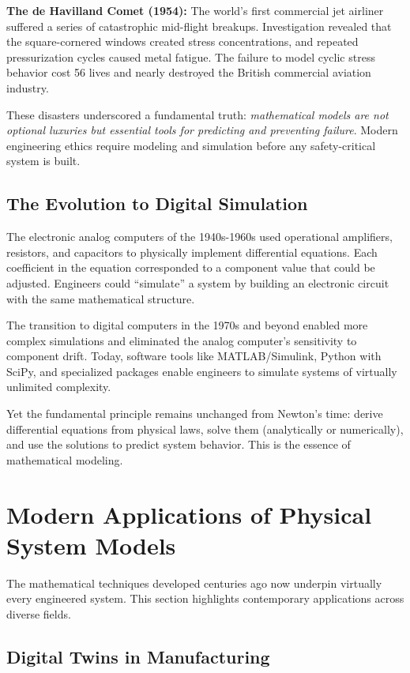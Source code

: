 \textbf{The de Havilland Comet (1954):} The world's first commercial jet airliner suffered a series of catastrophic mid-flight breakups. Investigation revealed that the square-cornered windows created stress concentrations, and repeated pressurization cycles caused metal fatigue. The failure to model cyclic stress behavior cost 56 lives and nearly destroyed the British commercial aviation industry.

These disasters underscored a fundamental truth: \textit{mathematical models are not optional luxuries but essential tools for predicting and preventing failure}. Modern engineering ethics require modeling and simulation before any safety-critical system is built.

\subsection{The Evolution to Digital Simulation}

The electronic analog computers of the 1940s-1960s used operational amplifiers, resistors, and capacitors to physically implement differential equations. Each coefficient in the equation corresponded to a component value that could be adjusted. Engineers could ``simulate'' a system by building an electronic circuit with the same mathematical structure.

The transition to digital computers in the 1970s and beyond enabled more complex simulations and eliminated the analog computer's sensitivity to component drift. Today, software tools like MATLAB/Simulink, Python with SciPy, and specialized packages enable engineers to simulate systems of virtually unlimited complexity.

Yet the fundamental principle remains unchanged from Newton's time: derive differential equations from physical laws, solve them (analytically or numerically), and use the solutions to predict system behavior. This is the essence of mathematical modeling.


\section{Modern Applications of Physical System Models}

The mathematical techniques developed centuries ago now underpin virtually every engineered system. This section highlights contemporary applications across diverse fields.

\subsection{Digital Twins in Manufacturing}

